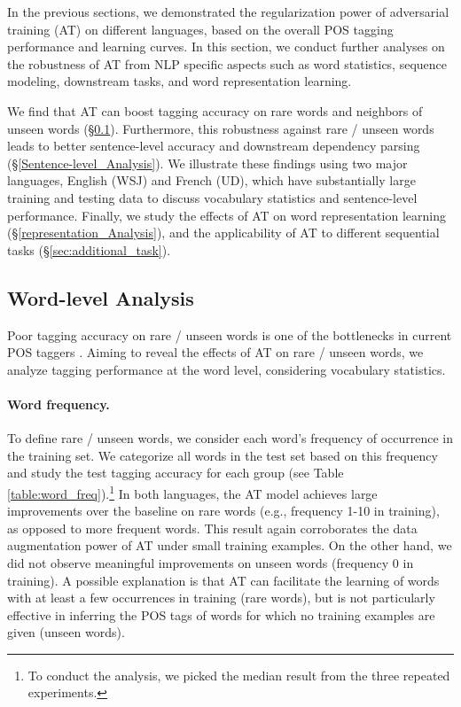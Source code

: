 \documentclass[11pt,a4paper]{article}
\begin{document}
In the previous sections, we demonstrated the regularization power of adversarial training (AT) on different languages, based on the overall POS tagging performance and learning curves.
In this section, we conduct further analyses on the robustness of AT from NLP specific aspects such as word statistics, sequence modeling, downstream tasks, and word representation learning.


We find that AT can boost tagging accuracy on rare words and neighbors of unseen words (\S \ref{Word-level_Analysis}).
Furthermore, this robustness against rare \!/\! unseen words leads to better sentence-level accuracy and downstream dependency parsing (\S \ref{Sentence-level_Analysis}).
We illustrate these findings using
two major languages, English (WSJ) and French (UD), 
which have substantially large training and testing data to discuss vocabulary statistics and sentence-level performance.
Finally, we study the effects of AT on word representation learning (\S \ref{representation_Analysis}), and {the applicability of AT to different sequential tasks} (\S \ref{sec:additional_task}).

\subsection{Word-level Analysis}
\label{Word-level_Analysis}
Poor tagging accuracy on rare \!/\! unseen words is one of the bottlenecks in current POS taggers \cite{Manning:2011:from97to100,plank2016multilingual}.
Aiming to reveal the effects of AT on rare \!/\! unseen words, we analyze tagging performance at the word level, considering vocabulary statistics.



\paragraph{Word frequency.} 



To define rare \!/\! unseen words, we consider each word's frequency of occurrence in the training set. 
We categorize all words in the test set based on this frequency and
study the test tagging accuracy for each group (see Table \ref{table:word_freq}).\footnote{
To conduct the analysis, we picked the median result from the three repeated experiments.}
In both languages, the AT model achieves large improvements over the baseline on rare words (e.g., frequency 1-10 in training), as opposed to more frequent words.
This result again corroborates the data augmentation power of AT under small training examples.
On the other hand, we did not observe meaningful improvements
on unseen words (frequency 0 in training). 
A possible explanation is that AT can facilitate the learning of words with at least a few occurrences in training (rare words),
but is not particularly effective in inferring the POS tags of words for which no training examples are given (unseen words).
\end{document}
